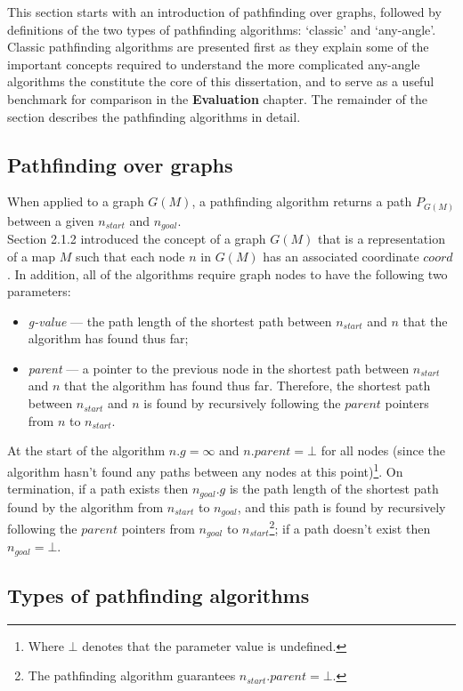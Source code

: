 \documentclass[12pt,notitlepage]{report}
\begin{document}
\noindent
This section starts with an introduction of pathfinding over graphs, followed by definitions of the two types of pathfinding algorithms: `classic' and `any-angle'. Classic pathfinding algorithms are presented first as they explain some of the important concepts required to understand the more complicated any-angle algorithms the constitute the core of this dissertation, and to serve as a useful benchmark for comparison in the {\bfseries Evaluation} chapter. The remainder of the section describes the pathfinding algorithms in detail.
 
\subsection{Pathfinding over graphs}

When applied to a graph $G(M)$, a pathfinding algorithm returns a path $P_{G(M)}$ between a given $n_{start}$ and $n_{goal}$.\\

\noindent
Section 2.1.2 introduced the concept of a graph $G(M)$ that is a representation of a map $M$ such that each node $n$ in $G(M)$ has an associated coordinate $coord$. In addition, all of the algorithms require graph nodes to have the following two parameters:
\begin{itemize}
\item {\em g-value} --- the path length of the shortest path between $n_{start}$ and $n$ that the algorithm has found thus far;
\item {\em parent} --- a pointer to the previous node in the shortest path between $n_{start}$ and $n$ that the algorithm has found thus far. Therefore, the shortest path between $n_{start}$ and $n$ is found by recursively following the $parent$ pointers from $n$ to $n_{start}$.
\end{itemize}

\noindent
At the start of the algorithm $n.g = \infty$ and $n.parent = \bot$ for all nodes (since the algorithm hasn't found any paths between any nodes at this point)\footnote{Where $\bot$ denotes that the parameter value is undefined.}. On termination, if a path exists then $n_{goal}.g$ is the path length of the shortest path found by the algorithm from $n_{start}$ to $n_{goal}$, and this path is found by recursively following the $parent$ pointers from $n_{goal}$ to $n_{start}$\footnote{The pathfinding algorithm guarantees $n_{start}.parent = \bot$.}; if a path doesn't exist then $n_{goal} = \bot$.

\subsection {Types of pathfinding algorithms}
\end{document}
